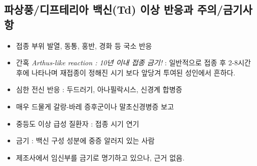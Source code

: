 \subsection{파상풍/디프테리아 백신(Td) 이상 반응과 주의/금기사항}
\begin{itemize}\tightlist
\item 접종 부위 발열, 동통, 홍반, 경화 등 국소 반응
\item 간혹 \emph{Arthus-like reaction : 10년 이내 접종 금기!} : 일반적으로 접종 후 2-8시간 후에 나타나며 재접종이 정해진 시기 보다 앞당겨 투여된 성인에서 흔하다.
\item 심한 전신 반응 : 두드러기, 아나필락시스, 신경계 합병증
\item 매우 드물게 갈랑-바레 증후군이나 말초신경병증 보고
\item 중등도 이상 급성 질환자 : 접종 시기 연기
\item 금기 : 백신 구성 성분에 중증 알러지 있는 사람
\item 제조사에서 임신부를 금기로 명기하고 있으나, 근거 없음.
\end{itemize}

